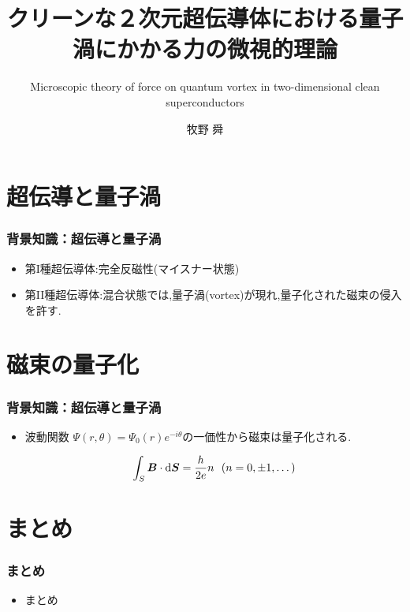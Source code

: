 \documentclass[dvipdfmx,11pt]{beamer}
\title{クリーンな２次元超伝導体における量子渦にかかる力の微視的理論}
\subtitle{Microscopic theory of force on quantum vortex in two-dimensional clean superconductors}
\author{牧野 舜}
\institute{Hoge University}
\date{}
\begin{document}
\begin{frame}\frametitle{}
    \titlepage
\end{frame}


\section{超伝導と量子渦}
\begin{frame}
    \frametitle{背景知識：超伝導と量子渦}

    \begin{itemize}
        \item
              第I種超伝導体:完全反磁性(マイスナー状態)
        \item
              第II種超伝導体:混合状態では,量子渦(vortex)が現れ,量子化された磁束の侵入を許す.
    \end{itemize}
\end{frame}

\section{磁束の量子化}
\begin{frame}
    \frametitle{背景知識：超伝導と量子渦}

    \begin{itemize}
        \item
              波動関数 $\Psi(r,\theta)=\Psi_{0}(r)e^{-i\theta}$の一価性から磁束は量子化される.

              \begin{equation}
                  \int_{S} \bm{B}\cdot\mathrm{d}\bm{S} = \frac{h}{2e}n \ \ (n=0,\pm1,\dots) \notag
              \end{equation}
    \end{itemize}
\end{frame}

\section{まとめ}
\begin{frame}
    \frametitle{まとめ}

    \begin{itemize}
        \item まとめ
    \end{itemize}
\end{frame}
\end{document}
